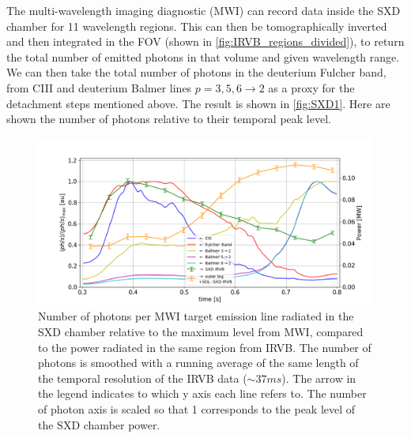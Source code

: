 The multi-wavelength imaging diagnostic (MWI) can record data inside the SXD chamber for 11 wavelength regions.\cite{Feng2021,Perek2019} This can then be tomographically inverted and then integrated in the FOV (shown in \autoref{fig:IRVB_regions_divided}), to return the total number of emitted photons in that volume and given wavelength range. We can then take the total number of photons in the deuterium Fulcher band, from CIII and deuterium Balmer lines $p=3, 5, 6 \rightarrow 2$ as a proxy for the detachment steps mentioned above. The result is shown in \autoref{fig:SXD1}. Here are shown the number of photons relative to their temporal peak level.
\begin{figure}[!ht]
	\centering
	\includegraphics[trim={40 0 25 50},clip,width=1\linewidth]{Chapters/chapter2/figs/IRVB-MASTU_shot-45371_pass1_bin7x3x3_gridres2cm_all_variables_absolute_small5.png}
	\caption{Number of photons per MWI target emission line radiated in the SXD chamber relative to the maximum level from MWI, compared to the power radiated in the same region from IRVB. The number of photons is smoothed with a running average of the same length of the temporal resolution of the IRVB data ($\sim37ms$). The arrow in the legend indicates to which y axis each line refers to. The number of photon axis is scaled so that 1 corresponds to the peak level of the SXD chamber power.}
	\label{fig:SXD1}
\end{figure}

